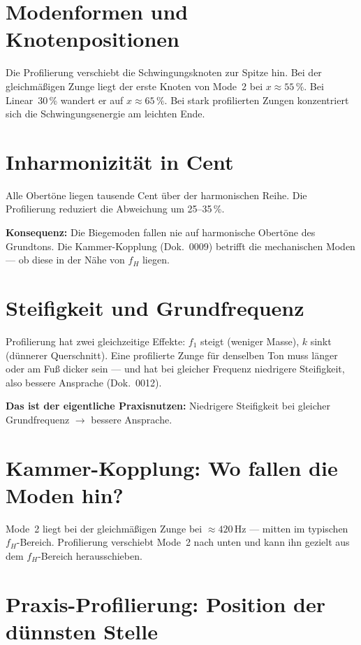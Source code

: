 \documentclass[11pt,a4paper]{article}
\begin{document}
\section{Modenformen und Knotenpositionen}

Die Profilierung verschiebt die Schwingungsknoten zur Spitze hin.
Bei der gleichmäßigen Zunge liegt der erste Knoten von Mode~2 bei $x \approx 55\,\%$.
Bei Linear~30\,\% wandert er auf $x \approx 65\,\%$. Bei stark profilierten
Zungen konzentriert sich die Schwingungsenergie am leichten Ende.

\section{Inharmonizität in Cent}

Alle Obertöne liegen tausende Cent über der harmonischen Reihe.
Die Profilierung reduziert die Abweichung um 25--35\,\%.

\begin{tcolorbox}[colframe=keygreen, colback=green!5!white]
\textbf{Konsequenz:} Die Biegemoden fallen nie auf harmonische Obertöne
des Grundtons. Die Kammer-Kopplung (Dok.~0009) betrifft die mechanischen
Moden --- ob diese in der Nähe von $f_H$ liegen.
\end{tcolorbox}

\section{Steifigkeit und Grundfrequenz}

Profilierung hat zwei gleichzeitige Effekte: $f_1$ steigt (weniger Masse),
$k$ sinkt (dünnerer Querschnitt). Eine profilierte Zunge für denselben Ton
muss länger oder am Fuß dicker sein --- und hat bei gleicher Frequenz
niedrigere Steifigkeit, also bessere Ansprache (Dok.~0012).

\textbf{Das ist der eigentliche Praxisnutzen:} Niedrigere Steifigkeit bei
gleicher Grundfrequenz $\to$ bessere Ansprache.

\section{Kammer-Kopplung: Wo fallen die Moden hin?}

Mode~2 liegt bei der gleichmäßigen Zunge bei $\approx 420$\,Hz --- mitten
im typischen $f_H$-Bereich. Profilierung verschiebt Mode~2 nach unten
und kann ihn gezielt aus dem $f_H$-Bereich herausschieben.

\section{Praxis-Profilierung: Position der dünnsten Stelle}
\end{document}
